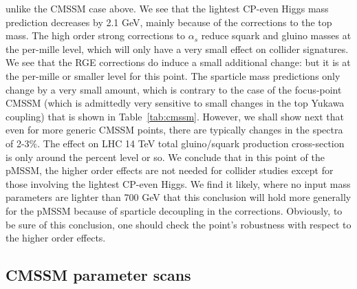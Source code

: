 \documentclass[final,3p,times,pdflatex]{elsarticle}
\begin{document}
unlike the CMSSM case above. 
We see that the lightest CP-even Higgs mass prediction decreases by 2.1 GeV,
mainly because of the  corrections to the top mass. The high order strong
corrections to $\alpha_s$ reduce
squark and gluino masses at the per-mille level, which will only have a very
small effect on collider signatures. 
We see that the RGE corrections do induce a small additional change: but it is
at the per-mille or smaller level for this point.
The sparticle mass predictions only change by a
very small amount, which is contrary to the case of the focus-point CMSSM
(which is 
admittedly very sensitive to small changes in the top Yukawa coupling) that is
shown in Table~\ref{tab:cmssm}. However, we shall show next that even for more
generic CMSSM points, there are typically changes in the spectra of 2-3$\%$.
The effect on LHC 14 TeV total gluino/squark production cross-section is only 
around the percent level or so.
We conclude that in this point of the pMSSM, the higher order effects are not
needed for collider studies except for those involving the lightest CP-even
Higgs. We find it likely, where no input mass parameters are lighter
than 700 GeV that this conclusion will hold more generally for the
pMSSM because of sparticle decoupling in the corrections. 
Obviously, to be sure of this conclusion, one should check the point's
robustness with respect to the higher order effects. 

\subsection{CMSSM parameter scans}
\end{document}
